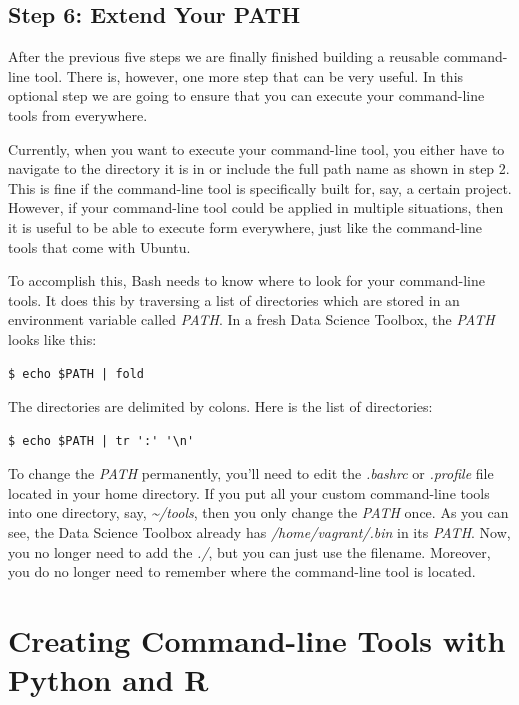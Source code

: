 \documentclass[
]{book}
\theoremstyle{definition}
\theoremstyle{definition}
\theoremstyle{definition}
\theoremstyle{remark}
\begin{document}
\hypertarget{step-6-extend-your-path}{%
\subsection{Step 6: Extend Your PATH}\label{step-6-extend-your-path}}

After the previous five steps we are finally finished building a reusable command-line tool. There is, however, one more step that can be very useful. In this optional step we are going to ensure that you can execute your command-line tools from everywhere.

Currently, when you want to execute your command-line tool, you either have to navigate to the directory it is in or include the full path name as shown in step 2. This is fine if the command-line tool is specifically built for, say, a certain project. However, if your command-line tool could be applied in multiple situations, then it is useful to be able to execute form everywhere, just like the command-line tools that come with Ubuntu.

To accomplish this, Bash needs to know where to look for your command-line tools. It does this by traversing a list of directories which are stored in an environment variable called \emph{PATH}. In a fresh Data Science Toolbox, the \emph{PATH} looks like this:

\begin{verbatim}
$ echo $PATH | fold
\end{verbatim}

The directories are delimited by colons. Here is the list of directories:

\begin{verbatim}
$ echo $PATH | tr ':' '\n'
\end{verbatim}

To change the \emph{PATH} permanently, you'll need to edit the \emph{.bashrc} or \emph{.profile} file located in your home directory. If you put all your custom command-line tools into one directory, say, \emph{\textasciitilde{}/tools}, then you only change the \emph{PATH} once. As you can see, the Data Science Toolbox already has \emph{/home/vagrant/.bin} in its \emph{PATH}. Now, you no longer need to add the \emph{./}, but you can just use the filename. Moreover, you do no longer need to remember where the command-line tool is located.

\hypertarget{creating-command-line-tools-with-python-and-r}{%
\section{Creating Command-line Tools with Python and R}\label{creating-command-line-tools-with-python-and-r}}
\end{document}
